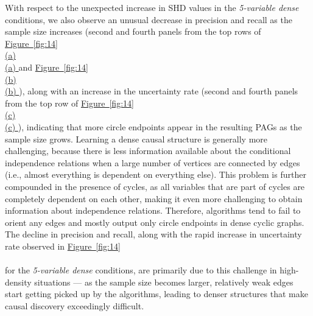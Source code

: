 \documentclass[twoside, 11pt]{article}
\newcommand*{\figref}[2][]{%
  \hyperref[{fig:#2}]{%
    Figure~\ref*{fig:#2}%
    \ifx\\#1\\%
    \else
      #1%
    \fi
  }%
}
\begin{document}
With respect to the unexpected increase in SHD values in the \textit{5-variable dense} conditions, we also observe an unusual decrease in precision and recall as the sample size increases (second and fourth panels from the top rows of \figref[(a)]{14} and \figref[(b)]{14}), along with an increase in the uncertainty rate (second and fourth panels from the top row of \figref[(c)]{14}), indicating that more circle endpoints appear in the resulting PAGs as the sample size grows.
Learning a dense causal structure is generally more challenging, because there is less information available about the conditional independence relations when a large number of vertices are connected by edges (i.e., almost everything is dependent on everything else). 
This problem is further compounded in the presence of cycles, as all variables that are part of cycles are completely dependent on each other, making it even more challenging to obtain information about independence relations. Therefore, algorithms tend to fail to orient any edges and mostly output only circle endpoints in dense cyclic graphs. The decline in precision and recall, along with the rapid increase in uncertainty rate observed in \figref[]{14} for the \textit{5-variable dense} conditions, are primarily due to this challenge in high-density situations --- as the sample size becomes larger, relatively weak edges start getting picked up by the algorithms, leading to denser structures that make causal discovery exceedingly difficult.

\end{document}
